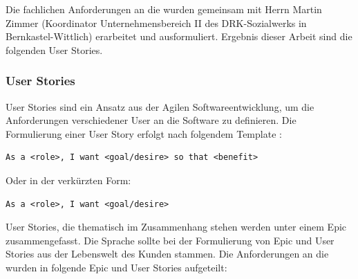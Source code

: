Die fachlichen Anforderungen an die \EBP wurden gemeinsam mit Herrn Martin Zimmer (Koordinator Unternehmensbereich II des DRK-Sozialwerks in
Bernkastel-Wittlich) erarbeitet und ausformuliert. Ergebnis dieser Arbeit sind die folgenden User Stories.

\subsubsection{User Stories}
\label{subsubsec:userstories}
User Stories sind ein Ansatz aus der Agilen Softwareentwicklung, um die Anforderungen verschiedener User an die Software zu definieren. Die
Formulierung einer User Story erfolgt nach folgendem Template \cite{Wikipedia_User_Story}:
\begin{lstlisting}
As a <role>, I want <goal/desire> so that <benefit>
\end{lstlisting}
Oder in der verkürzten Form:
\begin{lstlisting}
As a <role>, I want <goal/desire>
\end{lstlisting}
User Stories, die thematisch im Zusammenhang stehen werden unter einem Epic zusammengefasst. Die Sprache sollte bei der Formulierung
 von Epic und User Stories aus der Lebenswelt des Kunden stammen. Die Anforderungen an die \EBP wurden in folgende Epic und User Stories aufgeteilt:
\newline

